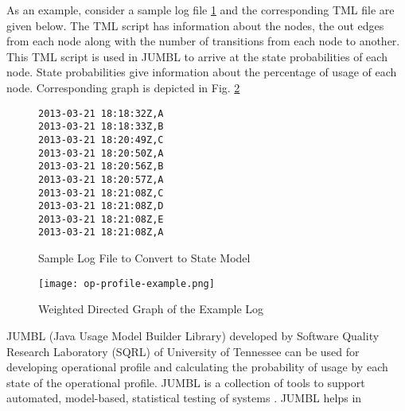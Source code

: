 As an example, consider a sample log file \ref{samplelogfile} and the corresponding TML file are given below. The TML script has information about the nodes, the out edges from each node along with the number of transitions from each node to another. This TML script is used in JUMBL to arrive at the state probabilities of each node. State probabilities give information about the percentage of usage of each node. Corresponding graph is depicted in Fig. \ref{op-profile-example}


\begin{figure}
\label{samplelogfile}
\hrulefill
\begin{verbatim}
2013-03-21 18:18:32Z,A
2013-03-21 18:18:33Z,B
2013-03-21 18:20:49Z,C
2013-03-21 18:20:50Z,A
2013-03-21 18:20:56Z,B
2013-03-21 18:20:57Z,A
2013-03-21 18:21:08Z,C
2013-03-21 18:21:08Z,D
2013-03-21 18:21:08Z,E
2013-03-21 18:21:08Z,A
\end{verbatim}
\hrulefill
\caption{Sample Log File to Convert to State Model}
\end{figure}

 
\begin{figure}[h]
  \centering
  \texttt{[image: op-profile-example.png]}
  \caption{Weighted Directed Graph of the Example Log}\label{op-profile-example}
\end{figure}

JUMBL (Java Usage Model Builder Library) developed by Software Quality Research Laboratory (SQRL) of University of Tennessee \cite{jumbl} can be used for developing operational profile and calculating the probability of usage by each state of the operational profile. JUMBL is a collection of tools to support automated, model-based, statistical testing of systems \cite{jug}. JUMBL helps in

